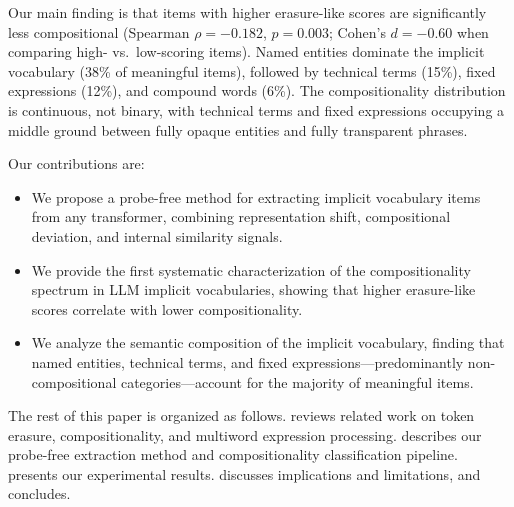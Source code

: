 Our main finding is that items with higher erasure-like scores are significantly less compositional (Spearman $\rho = -0.182$, $p = 0.003$; Cohen's $d = -0.60$ when comparing high- vs.\ low-scoring items).
Named entities dominate the implicit vocabulary (38\% of meaningful items), followed by technical terms (15\%), fixed expressions (12\%), and compound words (6\%).
The compositionality distribution is continuous, not binary, with technical terms and fixed expressions occupying a middle ground between fully opaque entities and fully transparent phrases.

Our contributions are:
\begin{itemize}[leftmargin=*,itemsep=0pt,topsep=0pt]
    \item We propose a probe-free method for extracting implicit vocabulary items from any transformer, combining representation shift, compositional deviation, and internal similarity signals.
    \item We provide the first systematic characterization of the compositionality spectrum in LLM implicit vocabularies, showing that higher erasure-like scores correlate with lower compositionality.
    \item We analyze the semantic composition of the implicit vocabulary, finding that named entities, technical terms, and fixed expressions---predominantly non-compositional categories---account for the majority of meaningful items.
\end{itemize}

The rest of this paper is organized as follows.
 reviews related work on token erasure, compositionality, and multiword expression processing.
 describes our probe-free extraction method and compositionality classification pipeline.
 presents our experimental results.
 discusses implications and limitations, and  concludes.
